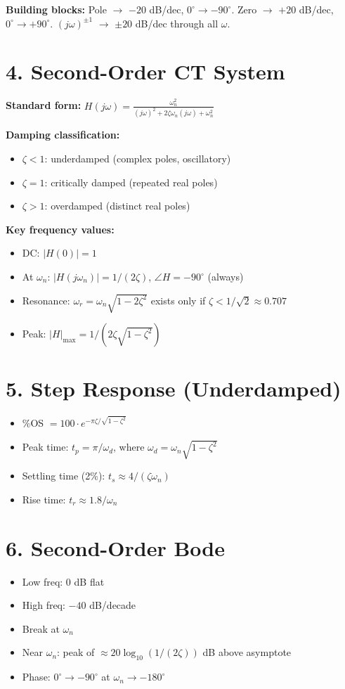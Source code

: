\documentclass[11pt]{article}
\begin{document}
\textbf{Building blocks:} Pole $\to$ $-20$ dB/dec, $0^\circ \to -90^\circ$. Zero $\to$ $+20$ dB/dec, $0^\circ \to +90^\circ$. $(j\omega)^{\pm 1}$ $\to$ $\pm 20$ dB/dec through all $\omega$.

\section*{4. Second-Order CT System}

\textbf{Standard form:} $H(j\omega) = \frac{\omega_n^2}{(j\omega)^2 + 2\zeta\omega_n(j\omega) + \omega_n^2}$

\textbf{Damping classification:}
\begin{itemize}
  \item $\zeta < 1$: underdamped (complex poles, oscillatory)
  \item $\zeta = 1$: critically damped (repeated real poles)
  \item $\zeta > 1$: overdamped (distinct real poles)
\end{itemize}

\textbf{Key frequency values:}
\begin{itemize}
  \item DC: $|H(0)| = 1$
  \item At $\omega_n$: $|H(j\omega_n)| = 1/(2\zeta)$, $\angle H = -90^\circ$ (always)
  \item Resonance: $\omega_r = \omega_n\sqrt{1-2\zeta^2}$ exists only if $\zeta < 1/\sqrt{2} \approx 0.707$
  \item Peak: $|H|_{\max} = 1/(2\zeta\sqrt{1-\zeta^2})$
\end{itemize}

\section*{5. Step Response (Underdamped)}
\begin{itemize}
  \item \%OS $= 100 \cdot e^{-\pi\zeta/\sqrt{1-\zeta^2}}$
  \item Peak time: $t_p = \pi/\omega_d$, where $\omega_d = \omega_n\sqrt{1-\zeta^2}$
  \item Settling time (2\%): $t_s \approx 4/(\zeta\omega_n)$
  \item Rise time: $t_r \approx 1.8/\omega_n$
\end{itemize}

\section*{6. Second-Order Bode}
\begin{itemize}
  \item Low freq: 0 dB flat
  \item High freq: $-40$ dB/decade
  \item Break at $\omega_n$
  \item Near $\omega_n$: peak of $\approx 20\log_{10}(1/(2\zeta))$ dB above asymptote
  \item Phase: $0^\circ \to -90^\circ$ at $\omega_n \to -180^\circ$
\end{itemize}
\end{document}
